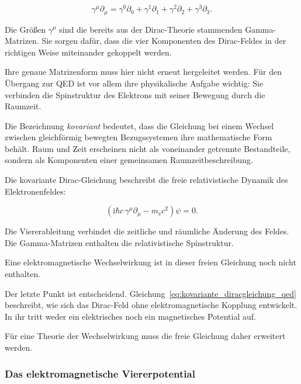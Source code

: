 \begin{equation}
	\gamma^\mu\partial_\mu
	=
	\gamma^0\partial_0
	+
	\gamma^1\partial_1
	+
	\gamma^2\partial_2
	+
	\gamma^3\partial_3.
	\label{eq:gamma_partial_summe_qed}
\end{equation}

Die Größen \(\gamma^\mu\) sind die bereits aus der Dirac-Theorie
stammenden Gamma-Matrizen.
Sie sorgen dafür, dass die vier Komponenten des Dirac-Feldes in der
richtigen Weise miteinander gekoppelt werden.

Ihre genaue Matrizenform muss hier nicht erneut hergeleitet werden.
Für den Übergang zur QED ist vor allem ihre physikalische Aufgabe
wichtig:
Sie verbinden die Spinstruktur des Elektrons mit seiner Bewegung durch
die Raumzeit.

Die Bezeichnung \emph{kovariant} bedeutet,
dass die Gleichung bei einem Wechsel zwischen gleichförmig bewegten
Bezugssystemen ihre mathematische Form behält.
Raum und Zeit erscheinen nicht als voneinander getrennte Bestandteile,
sondern als Komponenten einer gemeinsamen Raumzeitbeschreibung.

\begin{PhysicsBox}
	\label{box:bedeutung_kovariante_diracgleichung_qed}

	Die kovariante Dirac-Gleichung beschreibt die freie relativistische
	Dynamik des Elektronenfeldes:

	\begin{equation*}
		\left(
		\mathrm{i}\hbar c\,\gamma^\mu\partial_\mu
		-
		m_{\mathrm e}c^2
		\right)
		\psi
		=
		0.
	\end{equation*}

	Die Viererableitung verbindet die zeitliche und räumliche Änderung des
	Feldes. Die Gamma-Matrizen enthalten die relativistische
	Spinstruktur.

	Eine elektromagnetische Wechselwirkung ist in dieser freien Gleichung
	noch nicht enthalten.
\end{PhysicsBox}

Der letzte Punkt ist entscheidend.
Gleichung~\eqref{eq:kovariante_diracgleichung_qed} beschreibt, wie sich
das Dirac-Feld ohne elektromagnetische Kopplung entwickelt.
In ihr tritt weder ein elektrisches noch ein magnetisches Potential auf.

Für eine Theorie der Wechselwirkung muss die freie Gleichung daher
erweitert werden.

\subsubsection*{Das elektromagnetische Viererpotential}

